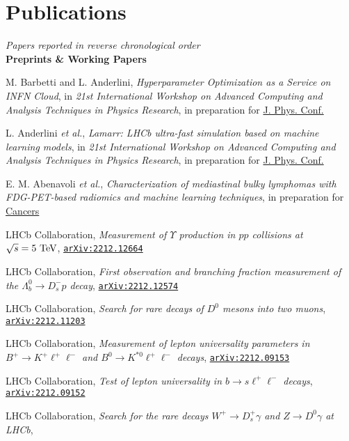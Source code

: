 \documentclass[a4paper, 11pt]{article}
\newenvironment{cvcontent}{
  \leftskip=0.5cm\rightskip=0cm
  \noindent\ignorespaces}{\par}
\newcommand{\journal}[1]{\textbf{\large #1}\\\vspace{-4mm}}
\newcommand{\arxiv}[1]{\href{https://arxiv.org/abs/#1}{\texttt{arXiv:#1}}}
\begin{document}
\section*{Publications}
\begin{cvcontent}
  \emph{Papers reported in reverse chronological order}\\[4mm]
  \journal{Preprints \& Working Papers}
  \begin{enumerate}[label={[\arabic*]}, leftmargin=1.5cm]
    \item M. Barbetti and L. Anderlini,
    \emph{Hyperparameter Optimization as a Service on INFN Cloud},
    in \emph{21st International Workshop on Advanced Computing and Analysis Techniques in Physics Research},
    in preparation for \href{https://iopscience.iop.org/journal/1742-6596}{J. Phys. Conf.}
    \item L. Anderlini \emph{et al.},
    \emph{Lamarr: LHCb ultra-fast simulation based on machine learning models},
    in \emph{21st International Workshop on Advanced Computing and Analysis Techniques in Physics Research},
    in preparation for \href{https://iopscience.iop.org/journal/1742-6596}{J. Phys. Conf.}
    \item E. M. Abenavoli \emph{et al.},
    \emph{Characterization of mediastinal bulky lymphomas with FDG-PET-based radiomics and machine learning techniques},
    in preparation for \href{https://www.mdpi.com/journal/cancers}{Cancers}
    \sloppy
    \item LHCb Collaboration,
    \emph{Measurement of $\Upsilon$ production in $pp$ collisions at $\sqrt{s}=5~\rm{TeV}$},
    \arxiv{2212.12664}
    \item LHCb Collaboration,
    \emph{First observation and branching fraction measurement of the $\Lambda_b^0\to D_s^- p$ decay},
    \arxiv{2212.12574}
    \item LHCb Collaboration,
    \emph{Search for rare decays of $D^0$ mesons into two muons},
    \arxiv{2212.11203}
    \item LHCb Collaboration,
    \emph{Measurement of lepton universality parameters in $B^+ \to K^+ \ell^+ \ell^-$ and $B^0 \to K^{*0} \ell^+ \ell^-$ decays},
    \arxiv{2212.09153}
    \item LHCb Collaboration,
    \emph{Test of lepton universality in $b \to s \ell^+ \ell^-$ decays},
    \arxiv{2212.09152}
    \item LHCb Collaboration,
    \emph{Search for the rare decays $W^+ \to D^+_s \gamma$ and $Z \to D^0 \gamma$ at LHCb},

\end{enumerate}
\end{cvcontent}
\end{document}
